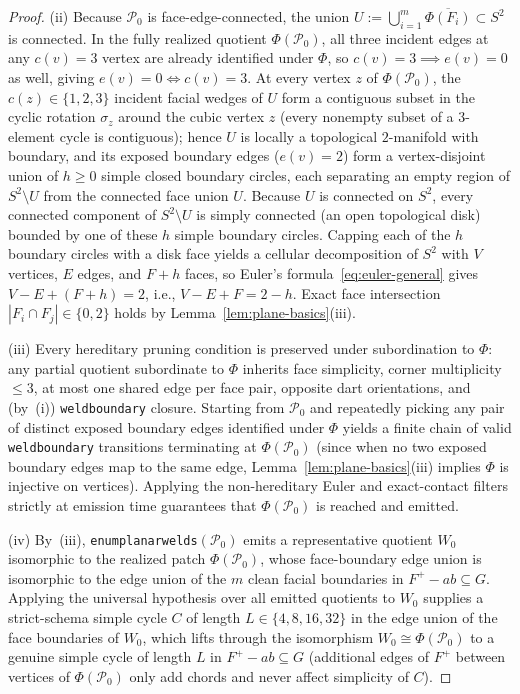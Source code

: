 \documentclass[11pt,reqno]{amsart}
\theoremstyle{plain}
\theoremstyle{definition}
\theoremstyle{remark}
\DeclareRobustCommand{\_}{\ifmmode\text{\textunderscore}\else\textunderscore\allowbreak\fi}
\begin{document}
\begin{proof}
(ii) Because $\mathcal{P}_0$ is face-edge-connected, the union $U := \bigcup_{i=1}^m \overline{\Phi(F_i)} \subset S^2$ is connected. In the fully realized quotient $\Phi(\mathcal{P}_0)$, all three incident edges at any $c(v) = 3$ vertex are already identified under $\Phi$, so $c(v) = 3 \implies e(v) = 0$ as well, giving $e(v) = 0 \iff c(v) = 3$. At every vertex $z$ of $\Phi(\mathcal{P}_0)$, the $c(z) \in \{1, 2, 3\}$ incident facial wedges of $U$ form a contiguous subset in the cyclic rotation $\sigma_z$ around the cubic vertex $z$ (every nonempty subset of a $3$-element cycle is contiguous); hence $U$ is locally a topological $2$-manifold with boundary, and its exposed boundary edges ($e(v) = 2$) form a vertex-disjoint union of $h \ge 0$ simple closed boundary circles, each separating an empty region of $S^2 \setminus U$ from the connected face union $U$. Because $U$ is connected on $S^2$, every connected component of $S^2 \setminus U$ is simply connected (an open topological disk) bounded by one of these $h$ simple boundary circles. Capping each of the $h$ boundary circles with a disk face yields a cellular decomposition of $S^2$ with $V$ vertices, $E$ edges, and $F + h$ faces, so Euler's formula~\eqref{eq:euler-general} gives $V - E + (F + h) = 2$, i.e., $V - E + F = 2 - h$. Exact face intersection $|F_i \cap F_j| \in \{0, 2\}$ holds by Lemma~\ref{lem:plane-basics}(iii).

(iii) Every hereditary pruning condition is preserved under subordination to $\Phi$: any partial quotient subordinate to $\Phi$ inherits face simplicity, corner multiplicity $\le 3$, at most one shared edge per face pair, opposite dart orientations, and (by~(i)) \texttt{weld\_boundary} closure. Starting from $\mathcal{P}_0$ and repeatedly picking any pair of distinct exposed boundary edges identified under $\Phi$ yields a finite chain of valid \texttt{weld\_boundary} transitions terminating at $\Phi(\mathcal{P}_0)$ (since when no two exposed boundary edges map to the same edge, Lemma~\ref{lem:plane-basics}(iii) implies $\Phi$ is injective on vertices). Applying the non-hereditary Euler and exact-contact filters strictly at emission time guarantees that $\Phi(\mathcal{P}_0)$ is reached and emitted.

(iv) By~(iii), \texttt{enum\_planar\_welds}$(\mathcal{P}_0)$ emits a representative quotient $W_0$ isomorphic to the realized patch $\Phi(\mathcal{P}_0)$, whose face-boundary edge union is isomorphic to the edge union of the $m$ clean facial boundaries in $F^+ - ab \subseteq G$. Applying the universal hypothesis over all emitted quotients to $W_0$ supplies a strict-schema simple cycle $C$ of length $L \in \{4, 8, 16, 32\}$ in the edge union of the face boundaries of $W_0$, which lifts through the isomorphism $W_0 \cong \Phi(\mathcal{P}_0)$ to a genuine simple cycle of length $L$ in $F^+ - ab \subseteq G$ (additional edges of $F^+$ between vertices of $\Phi(\mathcal{P}_0)$ only add chords and never affect simplicity of $C$).
\end{proof}
\end{document}
